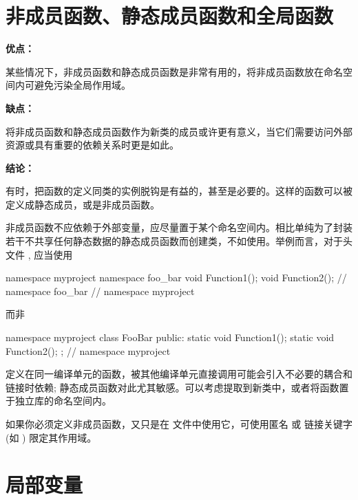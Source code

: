 \section{非成员函数、静态成员函数和全局函数} \label{nonmember-static-member-and-global-functions}


\textbf{优点：}

某些情况下，非成员函数和静态成员函数是非常有用的，将非成员函数放在命名空间内可避免污染全局作用域。

\textbf{缺点：}

将非成员函数和静态成员函数作为新类的成员或许更有意义，当它们需要访问外部资源或具有重要的依赖关系时更是如此。

\textbf{结论：}

有时，把函数的定义同类的实例脱钩是有益的，甚至是必要的。这样的函数可以被定义成静态成员，或是非成员函数。

非成员函数不应依赖于外部变量，应尽量置于某个命名空间内。相比单纯为了封装若干不共享任何静态数据的静态成员函数而创建类，不如使用。举例而言，对于头文件   , 应当使用

\begin{cppcode}
  namespace myproject {
  namespace foo_bar {
  void Function1();
  void Function2();
  }  // namespace foo_bar
  }  // namespace myproject
\end{cppcode}

而非

\begin{cppcode}
  namespace myproject {
      class FooBar {
          public:
          static void Function1();
          static void Function2();
        };
    }  // namespace myproject
\end{cppcode}

定义在同一编译单元的函数，被其他编译单元直接调用可能会引入不必要的耦合和链接时依赖; 静态成员函数对此尤其敏感。可以考虑提取到新类中，或者将函数置于独立库的命名空间内。

如果你必须定义非成员函数，又只是在  文件中使用它，可使用匿名  或  链接关键字 (如 ) 限定其作用域。

\section{局部变量} \label{local-variables}

